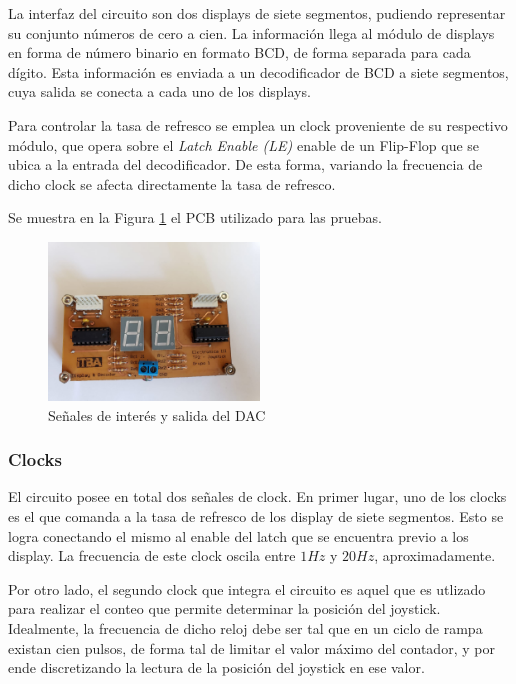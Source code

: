 La interfaz del circuito son dos displays de siete segmentos, pudiendo representar su conjunto n\'umeros de cero a cien. La informaci\'on llega al m\'odulo de displays en forma de n\'umero binario en formato BCD, de forma separada para cada d\'igito. Esta informaci\'on es enviada a un decodificador de BCD a siete segmentos, cuya salida se conecta a cada uno de los displays.


Para controlar la tasa de refresco se emplea un clock proveniente de su respectivo m\'odulo, que opera sobre el \textit{Latch Enable (LE)} enable de un Flip-Flop que se ubica a la entrada del decodificador. De esta forma, variando la frecuencia de dicho clock se afecta directamente la tasa de refresco.

Se muestra en la Figura \ref{fig:DISP_PCB} el  PCB utilizado para las pruebas.
\begin{figure}[H]
    \centering
    \includegraphics[width=0.5\textwidth]{../EJ8/Recursos/DISP_PCB}
    \caption{\label{fig:DISP_PCB}Se\~nales de inter\'es y salida del DAC}
\end{figure}

\subsubsection{Clocks}

El circuito posee en total dos se\~nales de clock. En primer lugar, uno de los clocks es el que comanda a la tasa de refresco de los display de siete segmentos. Esto se logra conectando el mismo al enable del latch que se encuentra previo a los display. La frecuencia de este clock oscila entre $1Hz$ y $20Hz$, aproximadamente.

Por otro lado, el segundo clock que integra el circuito es aquel que es utlizado para realizar el conteo que permite determinar la posici\'on del joystick. Idealmente, la frecuencia de dicho reloj debe ser tal que en un ciclo de rampa existan cien pulsos, de forma tal de limitar el valor m\'aximo del contador, y por ende discretizando la lectura de la posici\'on del joystick en ese valor.


